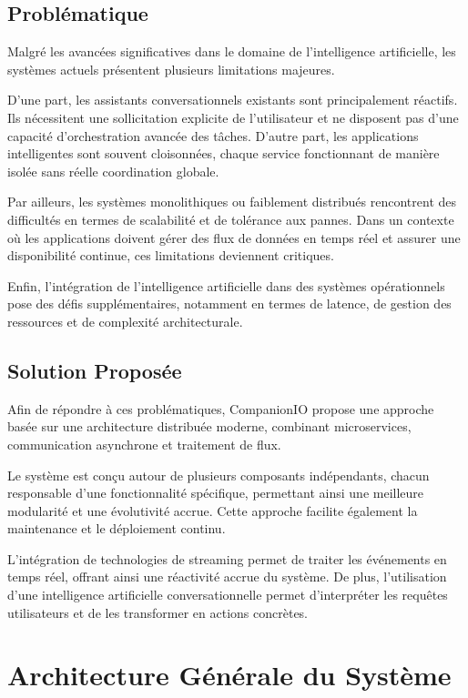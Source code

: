 \subsection{Problématique}

Malgré les avancées significatives dans le domaine de l’intelligence artificielle, les systèmes actuels présentent plusieurs limitations majeures.

D’une part, les assistants conversationnels existants sont principalement réactifs. Ils nécessitent une sollicitation explicite de l’utilisateur et ne disposent pas d’une capacité d’orchestration avancée des tâches. D’autre part, les applications intelligentes sont souvent cloisonnées, chaque service fonctionnant de manière isolée sans réelle coordination globale.

Par ailleurs, les systèmes monolithiques ou faiblement distribués rencontrent des difficultés en termes de scalabilité et de tolérance aux pannes. Dans un contexte où les applications doivent gérer des flux de données en temps réel et assurer une disponibilité continue, ces limitations deviennent critiques.

Enfin, l’intégration de l’intelligence artificielle dans des systèmes opérationnels pose des défis supplémentaires, notamment en termes de latence, de gestion des ressources et de complexité architecturale.

\subsection{Solution Proposée}

Afin de répondre à ces problématiques, CompanionIO propose une approche basée sur une architecture distribuée moderne, combinant microservices, communication asynchrone et traitement de flux.

Le système est conçu autour de plusieurs composants indépendants, chacun responsable d’une fonctionnalité spécifique, permettant ainsi une meilleure modularité et une évolutivité accrue. Cette approche facilite également la maintenance et le déploiement continu.

L’intégration de technologies de streaming permet de traiter les événements en temps réel, offrant ainsi une réactivité accrue du système. De plus, l’utilisation d’une intelligence artificielle conversationnelle permet d’interpréter les requêtes utilisateurs et de les transformer en actions concrètes.

\section{Architecture Générale du Système}

